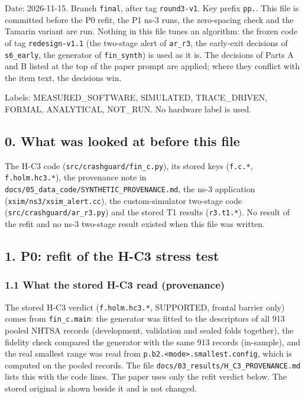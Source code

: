 


Date: 2026-11-15. Branch \texttt{final}, after tag \texttt{round3-v1}. Key prefix \texttt{pp.}. This file is committed before the P0 refit, the P1 ns-3 runs, the zero-spacing check and the Tamarin variant are run. Nothing in this file tunes an algorithm: the frozen code of tag \texttt{redesign-v1.1} (the two-stage alert of \texttt{ar\_r3}, the early-exit decisions of \texttt{s6\_early}, the generator of \texttt{fin\_synth}) is used as it is. The decisions of Parts A and B listed at the top of the paper prompt are applied; where they conflict with the item text, the decisions win.

Labels: MEASURED\_SOFTWARE, SIMULATED, TRACE\_DRIVEN, FORMAL, ANALYTICAL, NOT\_RUN. No hardware label is used.

\subsection*{0. What was looked at before this file}

The H-C3 code (\texttt{src/crashguard/fin\_c.py}), its stored keys (\texttt{f.c.*}, \texttt{f.holm.hc3.*}), the provenance note in \texttt{docs/05\_data\_code/SYNTHETIC\_PROVENANCE.md}, the ns-3 application (\texttt{xsim/ns3/xsim\_alert.cc}), the custom-simulator two-stage code (\texttt{src/crashguard/ar\_r3.py}) and the stored T1 results (\texttt{r3.t1.*}). No result of the refit and no ns-3 two-stage result existed when this file was written.

\subsection*{1. P0: refit of the H-C3 stress test}

\subsubsection*{1.1 What the stored H-C3 read (provenance)}

The stored H-C3 verdict (\texttt{f.holm.hc3.*}, SUPPORTED, frontal barrier only) comes from \texttt{fin\_c.main}: the generator was fitted to the descriptors of all 913 pooled NHTSA records (development, validation and sealed folds together), the fidelity check compared the generator with the same 913 records (in-sample), and the real smallest range was read from \texttt{p.b2.<mode>.smallest.config}, which is computed on the pooled records. The file \texttt{docs/03\_results/H\_C3\_PROVENANCE.md} lists this with the code lines. The paper uses only the refit verdict below. The stored original is shown beside it and is not changed.

